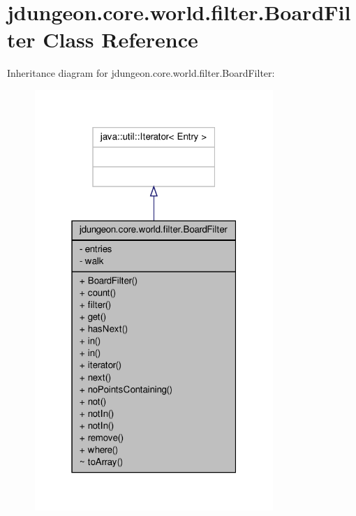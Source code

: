\hypertarget{classjdungeon_1_1core_1_1world_1_1filter_1_1_board_filter}{
\section{jdungeon.core.world.filter.BoardFilter Class Reference}
\label{classjdungeon_1_1core_1_1world_1_1filter_1_1_board_filter}
}


Inheritance diagram for jdungeon.core.world.filter.BoardFilter:
\nopagebreak
\begin{figure}[H]
\begin{center}
\leavevmode
\includegraphics[width=256pt]{classjdungeon_1_1core_1_1world_1_1filter_1_1_board_filter__inherit__graph}
\end{center}
\end{figure}


